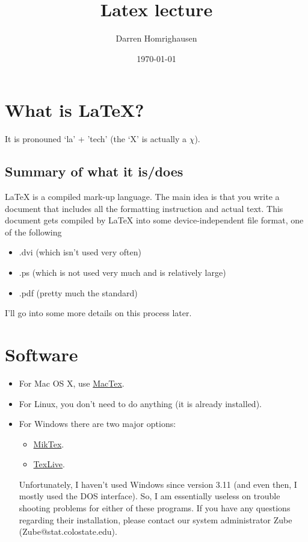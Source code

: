 \documentclass{article}
\begin{document}
\title{Latex lecture}
\author{Darren Homrighausen}
\date{\today}
\maketitle

\section{What is \LaTeX?}
It is pronouned `la' + 'tech' (the `X' is actually a $\chi$).

\subsection{Summary of what it is/does}
\LaTeX{} is a compiled mark-up language.  The main idea is that you write a document that includes all the formatting instruction and actual text.  This document gets compiled by \LaTeX{} into some device-independent file format, one of the following
\begin{itemize}
\item  .dvi (which isn't used very often)
\item .ps (which is not used very much and is relatively large)
\item .pdf (pretty much the standard)
\end{itemize}

I'll go into some more details on this process later.
\section{Software}

\begin{itemize}
\item For Mac OS X, use \href{http://tug.org/mactex/}{MacTex}.
\item For Linux, you don't need to do anything (it is already installed).
\item For Windows there are two major options:
\begin{itemize}
\item \href{http://miktex.org}{MikTex}.
\item \href{http://www.tug.org/texlive/}{TexLive}.
\end{itemize}
Unfortunately, I haven't used Windows since version 3.11 (and even then, I mostly used the DOS interface).  So, I am essentially useless on trouble shooting problems for either of these programs.  If you have any questions regarding their installation, please
contact our system administrator Zube (Zube@stat.colostate.edu).
\end{itemize}
\end{document}
